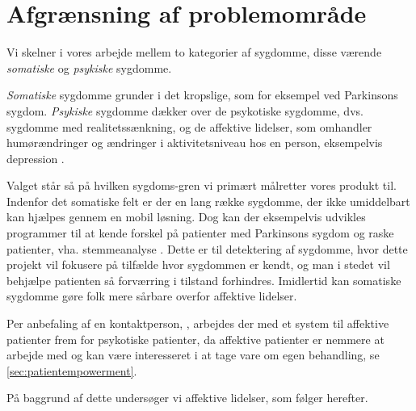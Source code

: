 \section{Afgrænsning af problemområde}
Vi skelner i vores arbejde mellem to kategorier af sygdomme, disse værende \textit{somatiske} og \textit{psykiske} sygdomme.

\textit{Somatiske} sygdomme grunder i det kropslige, som for eksempel ved Parkinsons sygdom.
\textit{Psykiske} sygdomme dækker over de psykotiske sygdomme, dvs. sygdomme med realitetssænkning, og de affektive lidelser, som omhandler humørændringer og ændringer i aktivitetsniveau hos en person, eksempelvis depression \citep{misc:netpsykpsykose}. 

Valget står så på hvilken sygdoms-gren vi primært målretter vores produkt til.
Indenfor det somatiske felt er der en lang række sygdomme, der ikke umiddelbart kan hjælpes gennem en mobil løsning.
Dog kan der eksempelvis udvikles programmer til at kende forskel på patienter med Parkinsons sygdom og raske patienter, vha. stemmeanalyse \citep{6168572}.
Dette er til detektering af sygdomme, hvor dette projekt vil fokusere på tilfælde hvor sygdommen er kendt, og man i stedet vil behjælpe patienten så forværring i tilstand forhindres.
Imidlertid kan somatiske sygdomme gøre folk mere sårbare overfor affektive lidelser.

Per anbefaling af en kontaktperson, \citet{misc:janne-rasmussen}, arbejdes der med et system til affektive patienter frem for psykotiske patienter, da affektive patienter er nemmere at arbejde med og kan være interesseret i at tage vare om egen behandling, se \cref{sec:patientempowerment}.

På baggrund af dette undersøger vi affektive lidelser, som følger herefter.